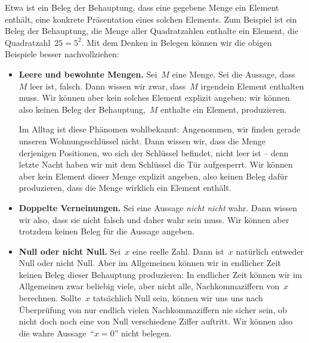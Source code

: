 \documentclass[twoside]{../zirkelblatt}
\theoremstyle{definition}
\theoremstyle{plain}
\theoremstyle{remark}
\newtheorem{bem}[defn]{Bemerkung}
\begin{document}
Etwa ist ein Beleg der Behauptung, dass eine gegebene Menge ein Element
enthält, eine konkrete Präsentation eines solchen Elements. Zum Beispiel ist ein Beleg der
Behauptung, die Menge aller Quadratzahlen enthalte ein Element, die
Quadratzahl~$25 = 5^2$. Mit dem Denken in Belegen können wir die obigen
Beispiele besser nachvollziehen:

\begin{itemize}
\item \textbf{Leere und bewohnte Mengen.} Sei~$M$ eine Menge. Sei die Aussage,
dass~$M$ leer ist, falsch. Dann wissen wir zwar, dass~$M$ irgendein Element
enthalten muss. Wir können aber kein solches Element explizit angeben; wir
können also keinen Beleg der Behauptung,~$M$ enthalte ein Element, produzieren.

Im Alltag ist diese Phänomen wohlbekannt: Angenommen, wir finden gerade unseren
Wohnungsschlüssel nicht. Dann wissen wir, dass die Menge derjenigen Positionen, wo
sich der Schlüssel befindet, nicht leer ist -- denn letzte Nacht haben wir mit
dem Schlüssel die Tür aufgesperrt. Wir können aber kein Element dieser Menge
explizit angeben, also keinen Beleg dafür produzieren, dass die Menge wirklich
ein Element enthält.
\item \textbf{Doppelte Verneinungen.} Sei eine Aussage \emph{nicht nicht} wahr.
Dann wissen wir also, dass sie nicht falsch und daher wahr sein muss. Wir
können aber trotzdem keinen Beleg für die Aussage angeben.
\item \textbf{Null oder nicht Null.} Sei~$x$ eine reelle Zahl. Dann ist~$x$
natürlich entweder Null oder nicht Null. Aber im Allgemeinen können wir in
endlicher Zeit keinen Beleg dieser Behauptung produzieren: In endlicher Zeit
können wir im Allgemeinen zwar beliebig viele, aber nicht alle,
Nachkommaziffern von~$x$ berechnen. Sollte~$x$ tatsächlich Null sein, können
wir uns uns nach Überprüfung von nur endlich vielen Nachkommaziffern nie sicher
sein, ob nicht doch noch eine von Null verschiedene Ziffer auftritt. Wir können
also die wahre Aussage~"`$x = 0$"' nicht belegen.
\end{itemize}

\end{document}
